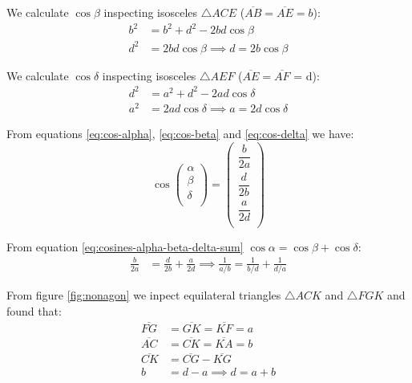 \documentclass[11pt]{article}
\begin{document}
We calculate $\cos\beta$ inspecting isosceles $\triangle{ACE}$
($\overline{AB} = \overline{AE} = b$):
\begin{align}
b^2 &= b^2 + d^2 - 2bd\cos\beta \nonumber\\
d^2 &= 2bd\cos\beta \implies \boxed{d = 2b\cos\beta} \label{eq:cos-beta}
\end{align}

We calculate $\cos\delta$ inspecting isosceles $\triangle{AEF}$
($\overline{AE} = \overline{AF}$ = d):
\begin{align}
d^2 &= a^2 + d^2 - 2ad\cos\delta \nonumber\\
a^2 &= 2ad\cos\delta \implies \boxed{ a = 2d\cos\delta } \label{eq:cos-delta}
\end{align}

From equations \ref{eq:cos-alpha}, \ref{eq:cos-beta} and \ref{eq:cos-delta} we have:
\begin{equation}\label{eq:cos-alpha-beta-delta}
\cos\left({\begin{array}{c} \alpha\\ \beta\\ \delta\\ \end{array}}\right)
= \left({\begin{array}{c}
\dfrac{b}{2a}\\[10pt]
\dfrac{d}{2b}\\[10pt]
\dfrac{a}{2d}\\[10pt]
\end{array}}\right)
\end{equation}

From equation \ref{eq:cosines-alpha-beta-delta-sum} $\cos\alpha = \cos\beta + \cos\delta$:
\begin{align}
\frac{b}{2a} &= \frac{d}{2b} + \frac{a}{2d}
 \implies \boxed{ \frac{1}{a/b} = \frac{1}{b/d} + \frac{1}{d/a}} \label{eq:optic}
\end{align}

From figure \ref{fig:nonagon} we inpect equilateral triangles
$\triangle{ACK}$ and $\triangle{FGK}$ and found that:
\begin{align}
\overline{FG} &= \overline{GK} = \overline{KF} = a \\
\overline{AC} &= \overline{CK} = \overline{KA} = b \\
\overline{CK} &= \overline{CG} - \overline{KG} \nonumber\\
 b &= d - a \implies \boxed{ d = a + b }
\end{align}
\end{document}
